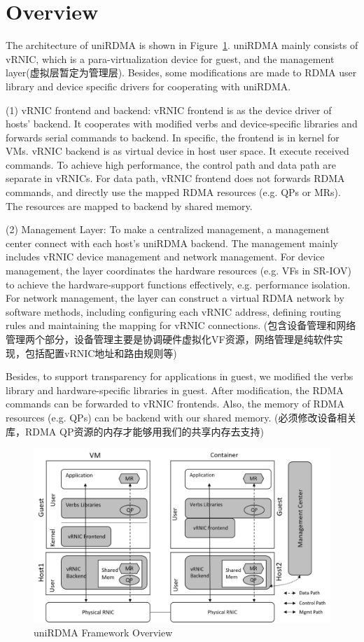 \section{Overview}
The architecture of uniRDMA is shown in Figure~\ref{fig:framework-overview}. uniRDMA mainly consists of vRNIC, which is a para-virtualization device for guest, and the management layer(虚拟层暂定为管理层). Besides, some modifications are made to RDMA user library and device specific drivers for cooperating with uniRDMA.

(1) vRNIC frontend and backend: vRNIC frontend is as the device driver of hosts' backend. It cooperates with modified verbs and device-specific libraries and forwards serial commands to backend. In specific, the frontend is in kernel for VMs. vRNIC backend is as virtual device in host user space. It execute received commands. To achieve high performance, the control path and data path are separate in vRNICs. For data path, vRNIC frontend does not forwards RDMA commands, and directly use the mapped RDMA resources (e.g. QPs or MRs). The resources are mapped to backend by shared memory.

(2) Management Layer: To make a centralized management, a management center connect with each host's uniRDMA backend. The management mainly includes vRNIC device management and network management. For device management, the layer coordinates the hardware resources (e.g. VFs in SR-IOV) to achieve the hardware-support functions effectively, e.g. performance isolation. For network management, the layer can construct a virtual RDMA network by software methods, including configuring each vRNIC address, defining routing rules and maintaining the mapping for vRNIC connections. (包含设备管理和网络管理两个部分，设备管理主要是协调硬件虚拟化VF资源，网络管理是纯软件实现，包括配置vRNIC地址和路由规则等)

Besides, to support transparency for applications in guest, we modified the verbs library and hardware-specific libraries in guest. After modification, the RDMA commands can be forwarded to vRNIC frontends. Also, the memory of RDMA resources (e.g. QPs) can be backend with our shared memory. (必须修改设备相关库，RDMA QP资源的内存才能够用我们的共享内存去支持)

\begin{figure}[!ht]
	\centering
	\includegraphics[width=1\linewidth]{images/framework-overview.png}
	\caption{uniRDMA Framework Overview}
	\label{fig:framework-overview}
\end{figure}